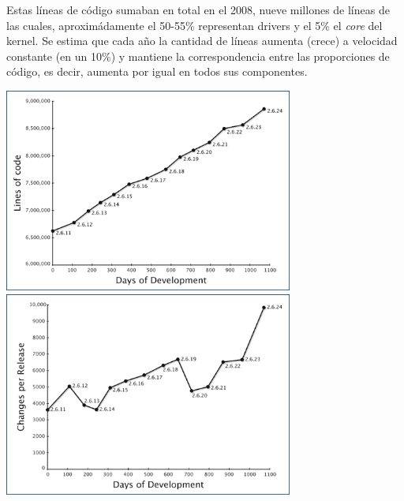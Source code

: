 \documentclass[spanish]{article}
\begin{document}
Estas l\'{i}neas de c\'{o}digo sumaban en total en el 2008, nueve millones de l\'{i}neas de las cuales, aproxim\'{a}damente el 50-55\% representan drivers y el 5\% el \textit{core} del kernel. Se estima que cada a\~{n}o la cantidad de l\'{i}neas aumenta (crece) a velocidad constante (en un 10\%) y mantiene la correspondencia entre las proporciones de c\'{o}digo, es decir, aumenta por igual en todos sus componentes.

\begin{center}
\includegraphics[width=9.5cm]{img/figure4-sizeperkernel.png}
\includegraphics[width=9.5cm]{img/figure2-changesperkernel.png}
\end{center}
\end{document}
